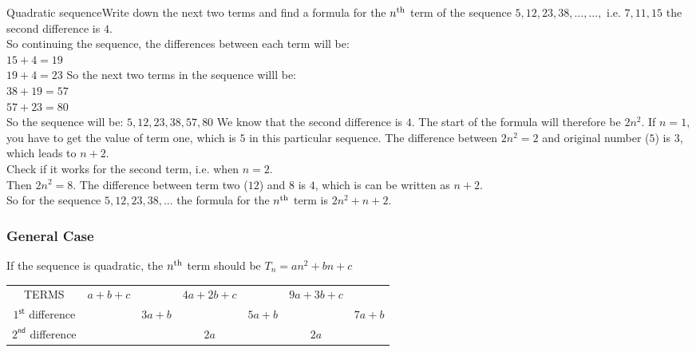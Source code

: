 \begin{wex}{Quadratic sequence}{Write down the next two terms and find a formula for the $n^{\rm th}$ term of the sequence $5, 12, 23, 38,..., ...,$}{ 
i.e. $7 , 11, 15$
the second difference is $4$.\\
So continuing the sequence, the differences between each term will be:\\
$15 + 4 = 19$\\
$19 + 4 = 23$
So the next two terms in the sequence willl be:\\
$38 + 19 = 57$\\
$57 + 23 = 80$\\
So the sequence will be:
$5, 12, 23, 38, 57, 80$
We know that the second difference is $4$. The start of the formula will therefore be $2n^2$.
If $n=1$, you have to get the value of term one, which is $5$ in this particular sequence.  The difference between $2n^2 = 2$ and original number ($5$) is $3$, which leads to $n+2$.\\
Check if it works for the second term, i.e. when $n=2$.\\
Then $2n^2=8$.  The difference between term two ($12$) and $8$ is $4$, which is can be written as $n+2$.\\
So for the sequence $5, 12, 23, 38,...$ the formula for the $n^{\rm th}$ term is $2n^2 + n + 2$.
}
\end{wex}

\subsubsection{General Case}
If the sequence is quadratic, the $n^{\rm th}$ term should be $T_n = an^2 + bn + c$

\begin{center}
\begin{tabular}{ccccccc}
TERMS & $a+b+c$ && $4a+2b+c$ && $9a+3b+c$ & \\
$1^{\textsf{st}}$ difference && $3a+b$ && $5a+b$ && $7a+b$ \\ 
$2^{\textsf{nd}}$ difference &&& $2a$ && $2a$ & \\
\end{tabular}
\end{center}

